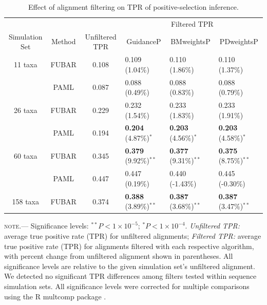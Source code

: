 \documentclass[10pt]{article}
\begin{document}
\begin{table}
\caption {\label{tab:casemodel} Effect of alignment filtering on TPR of positive-selection inference.}
\begin{tabular}{c c c l l l}
\hline\noalign{\smallskip}
& & & \multicolumn{3}{c}{Filtered TPR} \\
\cline{4-6}\noalign{\smallskip}
Simulation Set & Method & Unfiltered TPR & \multicolumn{1}{c}{GuidanceP} & \multicolumn{1}{c}{BMweightsP} & \multicolumn{1}{c}{PDweightsP} \\ 
\hline\noalign{\smallskip}
11 taxa  & FUBAR & 0.108 & 0.109  (1.04\%)   & 0.110  (1.86\%)  & 0.110  (1.37\%)        \\
              & PAML &  0.087 & 0.088  (0.49\%) &  0.088  (0.83\%)   & 0.088  (0.79\%)        \\
\hline
26 taxa   & FUBAR &  0.229 & 0.232 (1.54\%)  & 0.233 (1.83\%) & 0.233 (1.91\%)         \\
              & PAML & 0.194 & \textbf{0.204} (4.87\%)$^{\ast}$ & \textbf{0.203} (4.56\%)$^{\ast}$ & \textbf{0.203} (4.58\%)$^{\ast}$   \\
\hline
60 taxa  & FUBAR & 0.345 & \textbf{0.379} (9.92\%)$^{\ast\ast}$ & \textbf{0.377} (9.31\%)$^{\ast\ast}$ & \textbf{0.375} (8.75\%)$^{\ast\ast}$  \\
              & PAML & 0.447 & 0.447 (0.19\%) & 0.440 (-1.43\%) & 0.445 (-0.30\%) \\
\hline
158 taxa & FUBAR & 0.374 & \textbf{0.388} (3.89\%)$^{\ast\ast}$ & \textbf{0.387} (3.68\%)$^{\ast\ast}$ & \textbf{0.387} (3.47\%)$^{\ast\ast}$  \\
\hline
\end{tabular}
\newline
\textsc{note.}--- Significance levels: $^{\ast\ast} P < 1\times10^{-5}$; $^{\ast} P < 1\times10^{-4}$. \textit{Unfiltered TPR:} average true positive rate (TPR) for unfiltered alignments; \textit{Filtered TPR:} average true positive rate (TPR) for alignments filtered with each respective algorithm, with percent change from unfiltered alignment shown in parentheses. All significance levels are relative to the given simulation set's unfiltered alignment. We detected no significant TPR differences among filters tested within sequence simulation sets. All significance levels were corrected for multiple comparisons using the R multcomp package \citep{Hothorn2008}.

\end{table}
\end{document}
